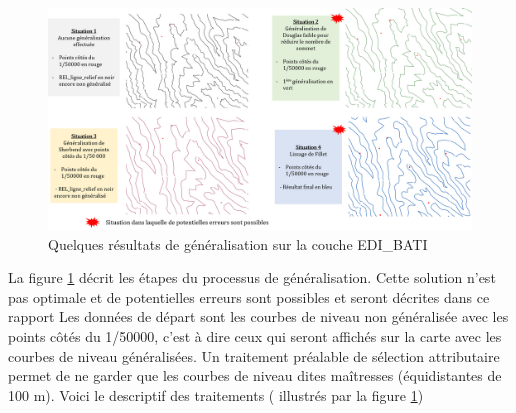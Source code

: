 \begin{figure}[ht]
\centering
\includegraphics[width=\linewidth]{images/chap1/sherbend.png}
\caption{Quelques résultats de généralisation sur la couche EDI\_BATI}
\label{situation_sherbend}
\end{figure}
La figure \ref{situation_sherbend} décrit les étapes du processus de généralisation. Cette solution n'est pas optimale et de potentielles erreurs sont possibles et seront décrites dans ce rapport
Les données de départ sont les courbes de niveau non généralisée avec les points côtés  du 1/50000, c'est à dire ceux qui seront affichés sur la carte avec les courbes de niveau généralisées.
Un traitement préalable de sélection attributaire permet de ne garder que les courbes de niveau dites maîtresses (équidistantes de 100 m). Voici le descriptif des traitements ( illustrés par la figure \ref{situation_sherbend})
